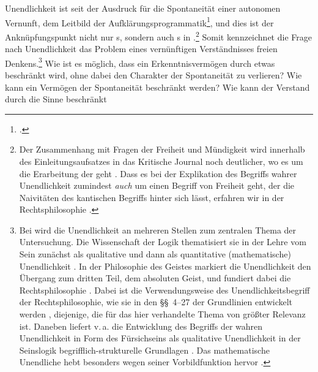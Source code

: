 Unendlichkeit ist seit  der
Ausdruck für die Spontaneität einer autonomen Vernunft, dem Leitbild der
Aufklärungsprogrammatik\footnote{\cite[Vgl.][]{Pinkard:AgencyFinitudeandIdealism2003}.},
und dies ist der Anknüpfungspunkt nicht nur s, sondern auch
s in .\footnote{Der Zusammenhang mit
Fragen der Freiheit und Mündigkeit wird innerhalb des Einleitungsaufsatzes in
das Kritische Journal noch deutlicher, wo es um die Erarbeitung der
 geht \parencite[vgl.][IV:
117--128]{Hegel:GesammelteWerke}. Dass es 
bei der Explikation des Begriffs wahrer Unendlichkeit zumindest \emph{auch} um einen Begriff von
Freiheit geht, der die Naivitäten des kantischen Begriffs hinter
sich lässt, erfahren wir in der Rechtsphilosophie \parencite[vgl.][XIV,1:
31--49]{Hegel:GesammelteWerke}.} Somit kennzeichnet die Frage nach
 Unendlichkeit das Problem eines vernünftigen Verständnisses
freien Denkens.\footnote{Bei  wird die Unendlichkeit an mehreren
Stellen zum zentralen Thema der Untersuchung. Die Wissenschaft der Logik
thematisiert sie in der Lehre vom Sein zunächst als qualitative und dann als
quantitative (mathematische) Unendlichkeit \parencite[vgl.][XXI: 124--143,
218--309]{Hegel:GesammelteWerke}. In der Philosophie des Geistes markiert die
Unendlichkeit den Übergang zum dritten Teil, dem absoluten Geist, und fundiert
dabei die Rechtsphilosophie \parencite[vgl.][XX:
379.5--19, 383.10--385.3, 476.4--477.37, 479.16--18]{Hegel:GesammelteWerke}. 
Dabei ist die Verwendungsweise des Unendlichkeitsbegriff der Rechtsphilosophie, wie
sie in den \S\S~4--27 der Grundlinien entwickelt werden \parencite[vgl.][XIV,1:
31.8--45.2]{Hegel:GesammelteWerke}, diejenige, die für das hier verhandelte
Thema von größter Relevanz ist. Daneben liefert v.\,a. die Entwicklung des
Begriffs der wahren Unendlichkeit in Form des Fürsichseins als qualitative
Unendlichkeit in der Seinslogik begrifflich-strukturelle Grundlagen
\parencite[vgl.][XXI: 144.3--4]{Hegel:GesammelteWerke}.
Das mathematische Unendliche hebt  besonders wegen seiner
Vorbildfunktion hervor \parencite[vgl.][XXI: 237.4--5]{Hegel:GesammelteWerke}.}
Wie ist es möglich, dass ein Erkenntnisvermögen durch etwas beschränkt wird, ohne
dabei den Charakter der Spontaneität zu verlieren? Wie kann ein Vermögen der
Spontaneität beschränkt werden? Wie kann der Verstand durch die Sinne beschränkt

